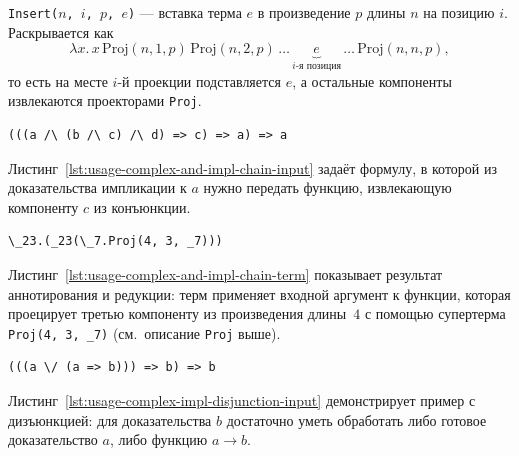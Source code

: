 \documentclass[14pt, russian]{scrartcl}
\begin{document}
\texttt{Insert($n$, $i$, $p$, $e$)} --- вставка терма $e$ в произведение
  $p$ длины $n$ на позицию $i$. Раскрывается как
  \[
    \lambda x.\, x\,\mathrm{Proj}(n, 1, p)\,\mathrm{Proj}(n, 2, p)\,\ldots\,
    \underbrace{e}_{i\text{-я позиция}}\,\ldots\,\mathrm{Proj}(n, n, p),
  \]
  то есть на месте $i$-й проекции подставляется $e$, а остальные компоненты
  извлекаются проекторами \texttt{Proj}.

\begin{listing}[!htb]
\caption{Входная формула \texttt{complex-and-impl-chain.txt}}
\label{lst:usage-complex-and-impl-chain-input}
\begin{verbatim}
(((a /\ (b /\ c) /\ d) => c) => a) => a
\end{verbatim}
\end{listing}

Листинг~\ref{lst:usage-complex-and-impl-chain-input} задаёт формулу, в которой из
доказательства импликации к $a$ нужно передать функцию, извлекающую компоненту
$c$ из конъюнкции.

\begin{listing}[!htb]
\caption{Редуцированный терм для \texttt{complex-and-impl-chain.txt}}
\label{lst:usage-complex-and-impl-chain-term}
\begin{verbatim}
\_23.(_23(\_7.Proj(4, 3, _7)))
\end{verbatim}
\end{listing}

Листинг~\ref{lst:usage-complex-and-impl-chain-term} показывает результат
аннотирования и редукции: терм применяет входной аргумент к функции, которая
проецирует третью компоненту из произведения длины~$4$ с помощью супертерма
\texttt{Proj(4, 3, \_7)} (см.~описание \texttt{Proj} выше).

\begin{listing}[!htb]
\caption{Входная формула \texttt{complex-impl-disjunction.txt}}
\label{lst:usage-complex-impl-disjunction-input}
\begin{verbatim}
(((a \/ (a => b))) => b) => b
\end{verbatim}
\end{listing}

Листинг~\ref{lst:usage-complex-impl-disjunction-input} демонстрирует пример с
дизъюнкцией: для доказательства $b$ достаточно уметь обработать либо готовое
доказательство $a$, либо функцию $a \rightarrow b$.
\end{document}
